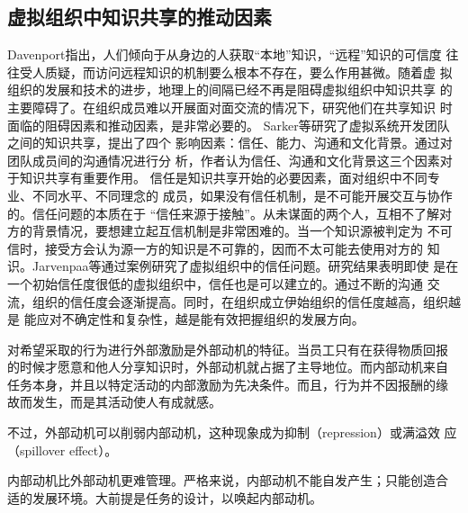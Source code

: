 \documentclass[12pt,a4paper]{ctexart}
\begin{document}
\subsection{虚拟组织中知识共享的推动因素}
Davenport指出，人们倾向于从身边的人获取“本地”知识，“远程”知识的可信度
往往受人质疑，而访问远程知识的机制要么根本不存在，要么作用甚微\cite{davenport1998wko}。随着虚
拟组织的发展和技术的进步，地理上的间隔已经不再是阻碍虚拟组织中知识共享
的主要障碍了。在组织成员难以开展面对面交流的情况下，研究他们在共享知识
时面临的阻碍因素和推动因素，是非常必要的。
Sarker等\cite{1435630}研究了虚拟系统开发团队之间的知识共享，提出了四个
影响因素：信任、能力、沟通和文化背景。通过对团队成员间的沟通情况进行分
析，作者认为信任、沟通和文化背景这三个因素对于知识共享有重要作用。
信任是知识共享开始的必要因素，面对组织中不同专业、不同水平、不同理念的
成员，如果没有信任机制，是不可能开展交互与协作的。信任问题的本质在于
“信任来源于接触”\cite{9506195264n.d.n.d.n.d.}。从未谋面的两个人，互相不了解对方的背景情况，要想建立起互信机制是非常困难的。当一个知识源被判定为
不可信时，接受方会认为源一方的知识是不可靠的，因而不太可能去使用对方的
知识。Jarvenpaa等通过案例研究了虚拟组织中的信任问题。研究结果表明即使
是在一个初始信任度很低的虚拟组织中，信任也是可以建立的。通过不断的沟通
交流，组织的信任度会逐渐提高。同时，在组织成立伊始组织的信任度越高，组织越是
能应对不确定性和复杂性，越是能有效把握组织的发展方向\cite{SirkkaL}。

对希望采取的行为进行外部激励是外部动机的特征。当员工只有在获得物质回报
的时候才愿意和他人分享知识时，外部动机就占据了主导地位。而内部动机来自
任务本身，并且以特定活动的内部激励为先决条件。而且，行为并不因报酬的缘
故而发生，而是其活动使人有成就感。

不过，外部动机可以削弱内部动机，这种现象成为抑制（repression）或满溢效
应（spillover effect）。

内部动机比外部动机更难管理。严格来说，内部动机不能自发产生；只能创造合
适的发展环境。大前提是任务的设计，以唤起内部动机。
\cite{KaiMertins2003}








\end{document}
